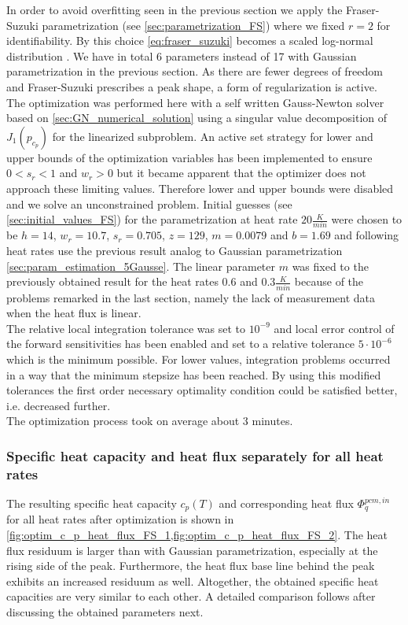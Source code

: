 \documentclass{scrartcl}[12pt, halfparskip]
\numberwithin{equation}{section}
\numberwithin{figure}{section}
\numberwithin{table}{section}
\begin{document}
In order to avoid overfitting seen in the previous section we apply the Fraser-Suzuki parametrization (see \cref{sec:parametrization_FS}) where we fixed $r=2$ for identifiability. By this choice \cref{eq:fraser_suzuki} becomes a scaled log-normal distribution \cite{fraser_suzuki_1}.
We have in total 6 parameters instead of 17 with Gaussian parametrization in the previous section. As there are fewer degrees of freedom and Fraser-Suzuki prescribes a peak shape, a form of regularization is active. \\
The optimization was performed here with a self written Gauss-Newton solver based on \cref{sec:GN_numerical_solution} using a singular value decomposition of $J_1(p_{c_p})$ for the linearized subproblem. 
An active set strategy for lower and upper bounds of the optimization variables has been implemented to ensure $0 < s_r < 1$ and $w_r > 0$ but it became apparent that the optimizer does not approach these limiting values. Therefore lower and upper bounds were disabled and we solve an unconstrained problem. Initial guesses (see \cref{sec:initial_values_FS}) for the parametrization at heat rate $20 \frac{K}{min}$ were chosen to be $h=14$, $w_r=10.7$, $s_r=0.705$, $z=129$, $m=0.0079$ and $b=1.69$ and following heat rates use the previous result analog to Gaussian parametrization \cref{sec:param_estimation_5Gausse}. The linear parameter $m$ was fixed to the previously obtained result for the heat rates $0.6$ and $0.3 \frac{K}{min}$ because of the problems remarked in the last section, namely the lack of measurement data when the heat flux is linear. \\
The relative local integration tolerance was set to $10^{-9}$ and local error control of the forward sensitivities has been enabled and set to a relative tolerance $5\cdot 10^{-6}$ which is the minimum possible. For lower values, integration problems occurred in a way that the minimum stepsize has been reached. By using this modified tolerances the first order necessary optimality condition could be satisfied better, i.e. decreased further. \\
The optimization process took on average about $3$ minutes.


\subsubsection{Specific heat capacity and heat flux separately for all heat rates}

The resulting specific heat capacity $c_p(T)$ and corresponding heat flux $\varPhi_q^{pcm,in}$ for all heat rates after optimization is shown in \cref{fig:optim_c_p_heat_flux_FS_1,fig:optim_c_p_heat_flux_FS_2}. The heat flux residuum is larger than with Gaussian parametrization, especially at the rising side of the peak. Furthermore, the heat flux base line behind the peak exhibits an increased residuum as well. Altogether, the obtained specific heat capacities are very similar to each other. A detailed comparison follows after discussing the obtained parameters next.
\end{document}
